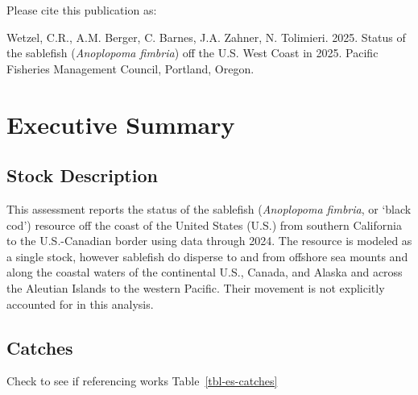 \documentclass[
]{scrartcl}
\renewcommand*\contentsname{Table of contents}
\newcommand\contentsname{Table of contents}
\begin{document}
\renewcommand*\contentsname{Table of contents}
{
\hypersetup{linkcolor=}
\setcounter{tocdepth}{3}
\tableofcontents
}
\listoffigures
\listoftables

\pagebreak
{}
\setcounter{page}{1}

\renewcommand{\thetable}{\roman{table}}
\renewcommand{\thefigure}{\roman{figure}}

\newpage{}

Please cite this publication as:

Wetzel, C.R., A.M. Berger, C. Barnes, J.A. Zahner, N. Tolimieri. 2025.
Status of the sablefish (\emph{Anoplopoma fimbria}) off the U.S. West
Coast in 2025. Pacific Fisheries Management Council, Portland, Oregon.

\newpage{}

\section*{Executive Summary}\label{executive-summary}

\subsection*{Stock Description}\label{stock-description}

This assessment reports the status of the sablefish (\emph{Anoplopoma
fimbria}, or `black cod') resource off the coast of the United States
(U.S.) from southern California to the U.S.-Canadian border using data
through 2024. The resource is modeled as a single stock, however
sablefish do disperse to and from offshore sea mounts and along the
coastal waters of the continental U.S., Canada, and Alaska and across
the Aleutian Islands to the western Pacific. Their movement is not
explicitly accounted for in this analysis.

\subsection*{Catches}\label{catches}

Check to see if referencing works Table~\ref{tbl-es-catches}
\end{document}
